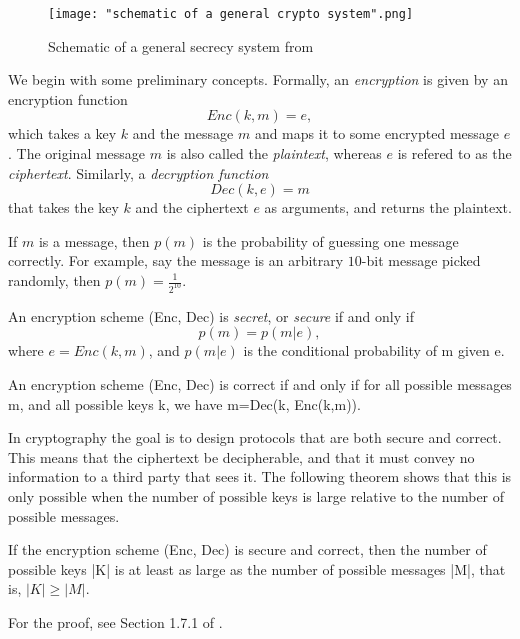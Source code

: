 \begin{figure}[h]
    \centering
    \texttt{[image: "schematic of a general crypto system".png]}
    \caption{Schematic of a general secrecy system from \cite{shannon1949communication}}
    \label{fig:general crypto schematic}
\end{figure}

\noindent
We begin with some preliminary concepts.  Formally, an {\emph{encryption}} is given by an encryption function 
$$Enc(k,m)=e ,$$
which takes a key $k$ and the message $m$ and maps it to some encrypted message $e$. The original message $m$ is also called the {\emph{plaintext}}, whereas $e$ is refered to as the {\emph{ciphertext}}. Similarly, a {\emph{decryption function}} $$Dec(k,e)=m$$
that takes the key $k$ and the ciphertext $e$ as arguments, and returns the plaintext. 

If $m$ is a message, then $p(m)$ is the probability of guessing one message correctly. For example, say the message is an arbitrary $10$-bit message picked randomly, then $p(m)=\frac{1}{2^{10}}$.


\begin{definition} \label{def: shannon}
An encryption scheme (Enc, Dec) is \textit{secret}, or \textit{secure} if and only if 
\begin{equation}
    p(m)=p(m|e),
\end{equation}
where $e=Enc(k,m)$, and $p(m|e)$ is the conditional probability of m given e.

An encryption scheme (Enc, Dec) is correct if and only if for all possible messages m, and all possible keys k, we have m=Dec(k, Enc(k,m)).
\end{definition}
In cryptography the goal is to design protocols that are both secure and correct. This means that the ciphertext be decipherable, and that it must convey no information to a third party that sees it. The following theorem shows that this is only possible when the number of possible keys is large relative to the number of possible messages.
\begin{theorem}
If the encryption scheme (Enc, Dec) is secure and correct, then the number of possible keys |K| is at least as large as the number of possible messages |M|, that is, $|K| \ge |M|$.
\end{theorem}
For the proof, see Section 1.7.1 of \cite{Wehner:notes}. 

